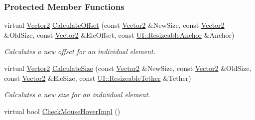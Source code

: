 \subsubsection*{Protected Member Functions}
\begin{DoxyCompactItemize}
\item 
\hypertarget{classMezzanine_1_1UI_1_1RenderableContainerWidget_a8c0d1898f91eb618bad0f1257fe0e202}{
virtual \hyperlink{classMezzanine_1_1Vector2}{Vector2} \hyperlink{classMezzanine_1_1UI_1_1RenderableContainerWidget_a8c0d1898f91eb618bad0f1257fe0e202}{CalculateOffset} (const \hyperlink{classMezzanine_1_1Vector2}{Vector2} \&NewSize, const \hyperlink{classMezzanine_1_1Vector2}{Vector2} \&OldSize, const \hyperlink{classMezzanine_1_1Vector2}{Vector2} \&EleOffset, const \hyperlink{namespaceMezzanine_1_1UI_a1c571649db3aa98f4e16285b5b754928}{UI::ResizeableAnchor} \&Anchor)}
\label{classMezzanine_1_1UI_1_1RenderableContainerWidget_a8c0d1898f91eb618bad0f1257fe0e202}

\begin{DoxyCompactList}\small\item\em Calculates a new offset for an individual element. \item\end{DoxyCompactList}\item 
\hypertarget{classMezzanine_1_1UI_1_1RenderableContainerWidget_abc24299d5ba8104f8936828d6b4b886a}{
virtual \hyperlink{classMezzanine_1_1Vector2}{Vector2} \hyperlink{classMezzanine_1_1UI_1_1RenderableContainerWidget_abc24299d5ba8104f8936828d6b4b886a}{CalculateSize} (const \hyperlink{classMezzanine_1_1Vector2}{Vector2} \&NewSize, const \hyperlink{classMezzanine_1_1Vector2}{Vector2} \&OldSize, const \hyperlink{classMezzanine_1_1Vector2}{Vector2} \&EleSize, const \hyperlink{namespaceMezzanine_1_1UI_a0334e290e4c9f6a5468fbe11164a17b9}{UI::ResizeableTether} \&Tether)}
\label{classMezzanine_1_1UI_1_1RenderableContainerWidget_abc24299d5ba8104f8936828d6b4b886a}

\begin{DoxyCompactList}\small\item\em Calculates a new size for an individual element. \item\end{DoxyCompactList}\item 
\hypertarget{classMezzanine_1_1UI_1_1RenderableContainerWidget_aaa39434fd933ca9b68041df382131340}{
virtual bool \hyperlink{classMezzanine_1_1UI_1_1RenderableContainerWidget_aaa39434fd933ca9b68041df382131340}{CheckMouseHoverImpl} ()}
\label{classMezzanine_1_1UI_1_1RenderableContainerWidget_aaa39434fd933ca9b68041df382131340}


\end{DoxyCompactItemize}
